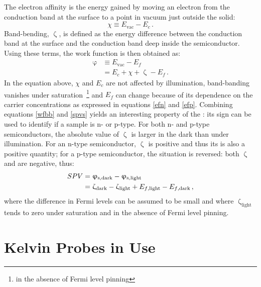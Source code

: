 The electron affinity is the energy gained by moving an electron from the conduction band at the surface to a point in vacuum just outside the solid:
\begin{equation}
\label{Eea}
	\chi \equiv E_{\text{vac}} - E_c \, .
\end{equation}
Band-bending, $\upzeta$, is defined as the energy difference between the conduction band at the surface and the conduction band deep inside the semiconductor. Using these terms, the work function is then obtained as:
\begin{align}
\label{wfbb}
	\upvarphi &\equiv E_{\text{vac}} - E_f \\
	 &= E_c + \chi + \upzeta - E_f \, .
\end{align}
In the equation above, $\chi$ and $E_c$ are not affected by illumination, band-banding vanishes under saturation~\footnote{in the absence of Fermi level pinning} and $E_f$ can change because of its dependence on the carrier concentrations as expressed in equations \eqref{efn} and \eqref{efp}. Combining equations \eqref{wfbb} and \eqref{spvs} yields an interesting property of the \spv{}: its sign can be used to identify if a sample is n- or p-type. For both n- and p-type semiconductors, the absolute value of $\upzeta$ is larger in the dark than under illumination. For an n-type semiconductor, $\upzeta$ is positive and thus its \spv{} is also a positive quantity; for a p-type semiconductor, the situation is reversed: both $\upzeta$ and \spv{} are negative, thus:
\begin{align}
	SPV 	&= \upvarphi _{\text{s,dark}} - \upvarphi _{\text{s,light}} \\
			&= \upzeta _{\text{dark}} - \upzeta _{\text{light}} + E_{f\text{,light}} - E_{f\text{,dark}} \, ,
\end{align}
where the difference in Fermi levels can be assumed to be small and where $\upzeta _{\text{light}}$ tends to zero under saturation and in the absence of Fermi level pinning.

\section{Kelvin Probes in Use}
\label{sec:kp}

